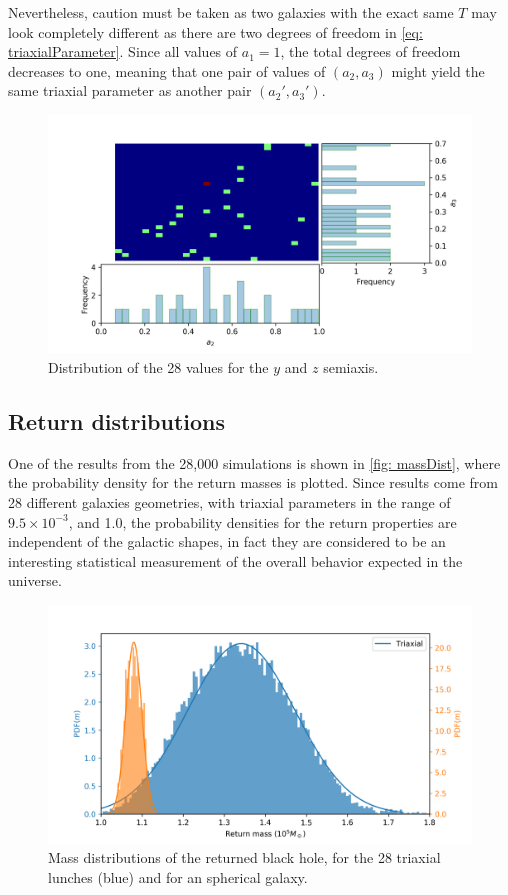 	Nevertheless, caution must be taken as two galaxies with the exact same $T$ may look completely different as there are two degrees of freedom in \autoref{eq: triaxialParameter}. Since all values of $a_1 = 1$, the total degrees of freedom decreases to one, meaning that one pair of values of $(a_2, a_3)$ might yield the same triaxial parameter as another pair $(a_2', a_3')$.
	
	\begin{figure}[h]
		\centering
		\includegraphics[width = 0.9\linewidth]{"../Files/Week 13/triaxial_axes"}
		\caption{Distribution of the 28 values for the $y$ and $z$ semiaxis.}
		\label{fig: semiaxisDist}
	\end{figure}

	\subsection{Return distributions}
	One of the results from the 28,000 simulations is shown in \autoref{fig: massDist}, where the probability density for the return masses is plotted. Since results come from 28 different galaxies geometries, with triaxial parameters in the range of $9.5\times10^{-3}$, and 1.0, the probability densities for the return properties are independent of the galactic shapes, in fact they are considered to be an interesting statistical measurement of the overall behavior expected in the universe.
	\begin{figure}[h]
		\centering
		\includegraphics[width=0.7\linewidth]{"../Files/Week 14/dist_masses"}
		\caption{Mass distributions of the returned black hole, for the 28 triaxial lunches (blue) and for an spherical galaxy.}
		\label{fig: massDist}
	\end{figure}

